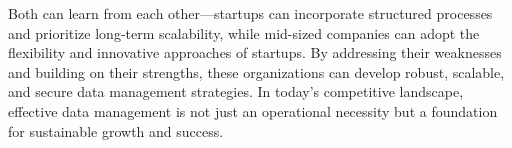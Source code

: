 \documentclass{article}
\begin{document}
Both can learn from each other—startups can incorporate structured processes and prioritize long-term scalability, while mid-sized companies can adopt the flexibility and innovative approaches of startups. By addressing their weaknesses and building on their strengths, these organizations can develop robust, scalable, and secure data management strategies. In today’s competitive landscape, effective data management is not just an operational necessity but a foundation for sustainable growth and success.





\end{document}
